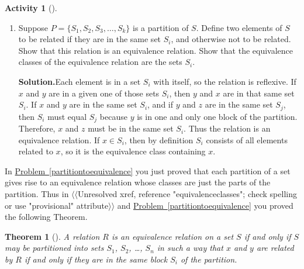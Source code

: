 \documentclass[10pt,]{book}
\theoremstyle{plain}
\newtheorem{theorem}{Theorem}[section]
\theoremstyle{definition}
\newtheorem{activity}[project]{Activity}
\numberwithin{equation}{chapter}
\begin{document}
\begin{activity}[]
\begin{enumerate}[label=(\alph*)]
~\par
\item Suppose \(P = \{S_1, S_2, S_3, \ldots, S_k\}\) is a partition of \(S\). Define two elements of \(S\) to be related if they are in the same set \(S_i\), and otherwise not to be related. Show that this relation is an equivalence relation. Show that the equivalence classes of the equivalence relation are the sets \(S_i\).%
\par\medskip\noindent%
\textbf{Solution.}\quad Each element is in a set \(S_i\) with itself, so the relation is reflexive. If \(x\) and \(y\) are in a given one of those sets \(S_i\), then \(y\) and \(x\) are in that same set \(S_i\). If \(x\) and \(y\) are in the same set \(S_i\), and if \(y\) and \(z\) are in the same set \(S_j\), then \(S_i\) must equal \(S_j\) because \(y\) is in one and only one block of the partition. Therefore, \(x\) and \(z\) must be in the same set \(S_i\). Thus the relation is an equivalence relation. If \(x\in S_i\), then by definition \(S_i\) consists of all elements related to \(x\), so it is the equivalence class containing \(x\).%

\end{enumerate}
\end{activity}
In \hyperref[partitiontoequivalence]{Problem~\ref{partitiontoequivalence}} you just proved that each partition of a set gives rise to an equivalence relation whose classes are just the parts of the partition. Thus in {$\langle\langle$Unresolved xref, reference "equivalenceclasses"; check spelling or use "provisional" attribute$\rangle\rangle$} and \hyperref[partitiontoequivalence]{Problem~\ref{partitiontoequivalence}} you proved the following Theorem.%
\begin{theorem}[{}]\label{theorem-10}
A relation \(R\) is an equivalence relation on a set \(S\) if and only if \(S\) may be partitioned into sets \(S_1\), \(S_2\), \dots{}, \(S_n\) in such a way that \(x\) and \(y\) are related by \(R\) if and only if they are in the same block \(S_i\) of the partition.%
\end{theorem}
%
\par
\end{document}
